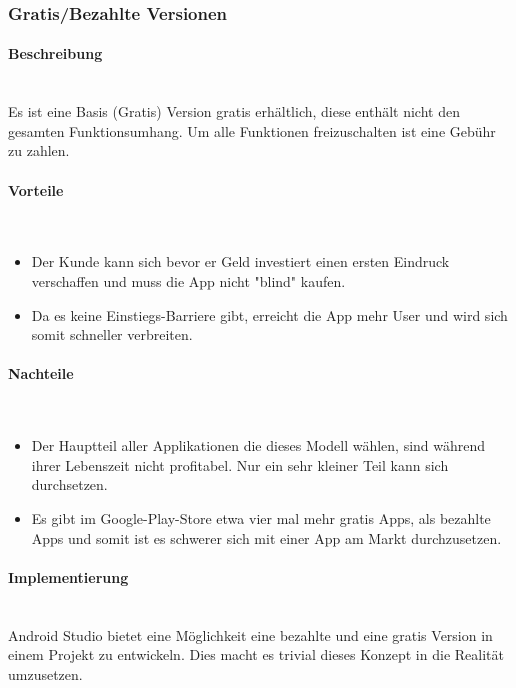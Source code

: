 \documentclass[FIPLY_base.tex]{subfiles}
\begin{document}
\subsubsection{Gratis/Bezahlte Versionen}


\paragraph{Beschreibung}\ \\
Es ist eine Basis (Gratis) Version gratis erhältlich, diese enthält nicht den gesamten Funktionsumhang.
Um alle Funktionen freizuschalten ist eine Gebühr zu zahlen.

\paragraph{Vorteile}\ \\
\begin{itemize}
\item Der Kunde kann sich bevor er Geld investiert einen ersten Eindruck verschaffen und muss die App nicht "blind" kaufen.
\item Da es keine Einstiegs-Barriere gibt, erreicht die App mehr User und wird sich somit schneller verbreiten.
\end{itemize}

\paragraph{Nachteile}\ \\
\begin{itemize}
\item Der Hauptteil aller Applikationen die dieses Modell wählen, sind während ihrer Lebenszeit nicht profitabel. Nur ein sehr kleiner Teil kann sich durchsetzen.
\item Es gibt im Google-Play-Store etwa vier mal mehr gratis Apps, als bezahlte Apps und somit ist es schwerer sich mit einer App am Markt durchzusetzen.
\end{itemize}

\paragraph{Implementierung}\ \\

Android Studio bietet eine Möglichkeit eine bezahlte und eine gratis Version in einem Projekt zu entwickeln.
Dies macht es trivial dieses Konzept in die Realität umzusetzen.
\end{document}
